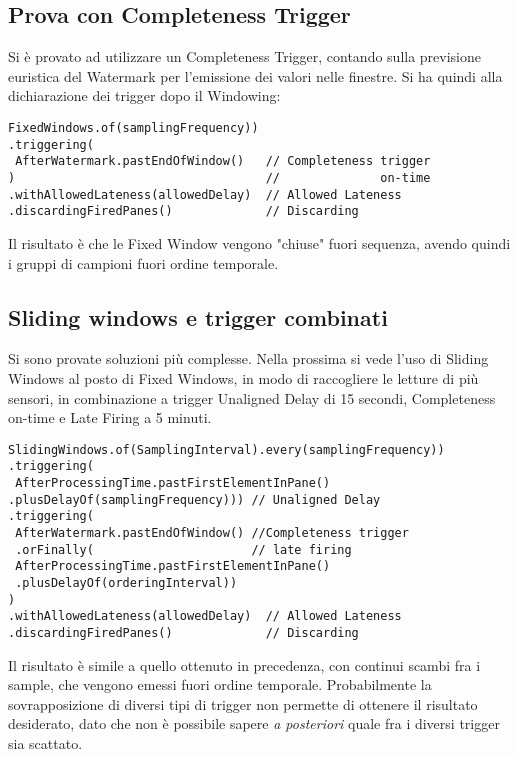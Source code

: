 \subsection{Prova con Completeness Trigger}
Si è provato ad utilizzare un Completeness Trigger, contando sulla previsione euristica del Watermark per l'emissione dei valori nelle finestre. Si ha quindi alla dichiarazione dei trigger dopo il Windowing:
\lstset{language=Java}
\begin{lstlisting}
FixedWindows.of(samplingFrequency))
.triggering(
 AfterWatermark.pastEndOfWindow()   // Completeness trigger
)                                   //              on-time
.withAllowedLateness(allowedDelay)  // Allowed Lateness
.discardingFiredPanes()             // Discarding
\end{lstlisting}
Il risultato è che le Fixed Window vengono "chiuse" fuori sequenza, avendo quindi i gruppi di campioni fuori ordine temporale.
\subsection{Sliding windows e trigger combinati}
Si sono provate soluzioni più complesse. Nella prossima si vede l'uso di Sliding Windows al posto di Fixed Windows, in modo di raccogliere le letture di più sensori, in combinazione a trigger Unaligned Delay di 15 secondi, Completeness on-time e Late Firing a 5 minuti.
\begin{lstlisting}
SlidingWindows.of(SamplingInterval).every(samplingFrequency))
.triggering(
 AfterProcessingTime.pastFirstElementInPane()
.plusDelayOf(samplingFrequency))) // Unaligned Delay
.triggering(
 AfterWatermark.pastEndOfWindow() //Completeness trigger
 .orFinally(                      // late firing
 AfterProcessingTime.pastFirstElementInPane()
 .plusDelayOf(orderingInterval))
)
.withAllowedLateness(allowedDelay)  // Allowed Lateness
.discardingFiredPanes()             // Discarding
\end{lstlisting}
Il risultato è simile a quello ottenuto in precedenza, con continui scambi fra i sample, che vengono emessi fuori ordine temporale. Probabilmente la sovrapposizione di diversi tipi di trigger non permette di ottenere il risultato desiderato, dato che non è possibile sapere \textit{a posteriori} quale fra i diversi trigger sia scattato.
